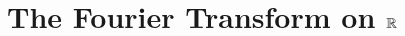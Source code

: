 \documentclass[../../main.tex]{subfiles}
\begin{document}
\chapter{The Fourier Transform on \(\mathbb{R}\)}
\end{document}

